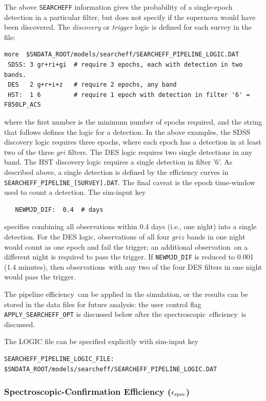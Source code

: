 \documentclass[12pt]{article}
\newcommand{\eff}{efficiency}
\newcommand{\simeffspec}{\epsilon_{\rm spec}}
\newcommand{\spec}{spectroscopic}
\newcommand{\obs}{observation}
\newcommand{\obss}{observations}
\begin{document}
{\clearpage
The above {\tt SEARCHEFF} information gives the probability
of a single-epoch detection in a particular filter, but does
not specify if the supernova would have been discovered.
The {\it discovery} or {\it trigger} logic is defined for each 
survey in the file:
%
\begin{Verbatim}[frame=single]
 more  $SNDATA_ROOT/models/searcheff/SEARCHEFF_PIPELINE_LOGIC.DAT
 SDSS: 3 gr+ri+gi  # require 3 epochs, each with detection in two bands.
 DES   2 g+r+i+z   # require 2 epochs, any band
 HST:  1 6         # require 1 epoch with detection in filter '6' = F850LP_ACS
\end{Verbatim}
where the first number is the minimum number of epochs required,
and the string that follows defines the logic for a detection.
In the above examples, the SDSS discovery logic requires
three epochs, where each epoch has a detection in at least
two of the three $gri$ filters. 
The DES logic requires two single detections in any band.
The HST discovery logic requires a single detection in filter '6'.
As described above, a single detection is defined by the 
efficiency curves in {\tt SEARCHEFF\_PIPELINE\_[SURVEY].DAT}.
The final caveat is the epoch time-window used to 
count a detection. The sim-input key
\begin{verbatim}
   NEWMJD_DIF:  0.4  # days
\end{verbatim}
%
specifies combining all observations within 0.4 days (i.e., one night)
into a single detection. For the DES logic, observations of
all four $griz$ bands in one night would count as one epoch
and fail the trigger; an additional \obs\ on a different night
is required to pass the trigger.  If {\tt NEWMJD\_DIF} is
reduced to 0.001 (1.4 minutes), then \obss\ with any two of the
four DES filters in one night would pass the trigger.


The pipeline \eff\ can be applied in the simulation,
or the results can be stored in the data files for future
analysis: the user control flag {\tt APPLY\_SEARCHEFF\_OPT} 
is discussed below after the \spec\ \eff\ is discussed.

The LOGIC file can be specified explicitly with sim-input key
%
\begin{verbatim}
SEARCHEFF_PIPELINE_LOGIC_FILE:  $SNDATA_ROOT/models/searcheff/SEARCHEFF_PIPELINE_LOGIC.DAT
\end{verbatim}


\clearpage
\subsubsection{Spectroscopic-Confirmation Efficiency ($\simeffspec$) }
\label{sss:eff_spec}

}
\end{document}
